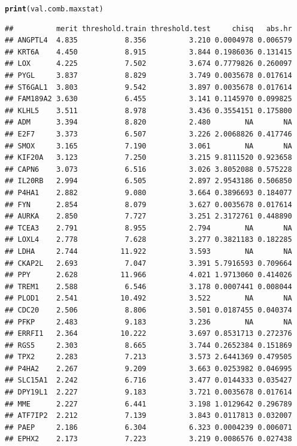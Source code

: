 \documentclass{article}\usepackage[]{graphicx}\usepackage[]{color}
\makeatletter
\newcommand{\hlstd}[1]{\textcolor[rgb]{0.345,0.345,0.345}{#1}}%
\newcommand{\hlkwd}[1]{\textcolor[rgb]{0.737,0.353,0.396}{\textbf{#1}}}%
\newenvironment{kframe}{%
 \def\at@end@of@kframe{}%
 \ifinner\ifhmode%
  \def\at@end@of@kframe{\end{minipage}}%
  \begin{minipage}{\columnwidth}%
 \fi\fi%
 \def\FrameCommand##1{\hskip\@totalleftmargin \hskip-\fboxsep
 \colorbox{shadecolor}{##1}\hskip-\fboxsep
     \hskip-\linewidth \hskip-\@totalleftmargin \hskip\columnwidth}%
 \MakeFramed {\advance\hsize-\width
   \@totalleftmargin\z@ \linewidth\hsize
   \@setminipage}}%
 {\par\unskip\endMakeFramed%
 \at@end@of@kframe}
\newenvironment{knitrout}{}{} %
\makeatother
\begin{document}
\begin{knitrout}
\begin{kframe}
\begin{alltt}
\hlkwd{print}\hlstd{(val.comb.maxstat)}
\end{alltt}
\begin{verbatim}
##          merit threshold.train threshold.test     chisq   abs.hr
## ANGPTL4  4.835           8.356          3.210 0.0004978 0.006579
## KRT6A    4.450           8.915          3.844 0.1986036 0.131415
## LOX      4.225           7.502          3.674 0.7779826 0.260097
## PYGL     3.837           8.829          3.749 0.0035678 0.017614
## ST6GAL1  3.803           9.542          3.897 0.0035678 0.017614
## FAM189A2 3.630           6.455          3.141 0.1145970 0.099825
## KLHL5    3.511           8.978          3.436 0.3554151 0.175800
## ADM      3.394           8.820          2.480        NA       NA
## E2F7     3.373           6.507          3.226 2.0068826 0.417746
## SMOX     3.165           7.190          3.061        NA       NA
## KIF20A   3.123           7.250          3.215 9.8111520 0.923658
## CAPN6    3.073           6.516          3.026 3.8052088 0.575228
## IL20RB   2.994           6.505          2.897 2.9543186 0.506850
## P4HA1    2.882           9.080          3.664 0.3896693 0.184077
## FYN      2.854           8.079          3.627 0.0035678 0.017614
## AURKA    2.850           7.727          3.251 2.3172761 0.448890
## TCEA3    2.791           8.955          2.794        NA       NA
## LOXL4    2.778           7.628          3.277 0.3821183 0.182285
## LDHA     2.744          11.922          3.593        NA       NA
## CKAP2L   2.693           7.047          3.391 5.7916593 0.709664
## PPY      2.628          11.966          4.021 1.9713060 0.414026
## TREM1    2.588           6.546          3.178 0.0007441 0.008044
## PLOD1    2.541          10.492          3.522        NA       NA
## CDC20    2.506           8.806          3.501 0.0187455 0.040374
## PFKP     2.483           9.183          3.236        NA       NA
## ERRFI1   2.364          10.222          3.697 0.8531713 0.272376
## RGS5     2.303           8.665          3.744 0.2652384 0.151869
## TPX2     2.283           7.213          3.573 2.6441369 0.479505
## P4HA2    2.267           9.209          3.663 0.0253982 0.046995
## SLC15A1  2.242           6.716          3.477 0.0144333 0.035427
## DPY19L1  2.227           9.183          3.721 0.0035678 0.017614
## MME      2.227           6.441          3.198 1.0129642 0.296789
## ATF7IP2  2.212           7.139          3.843 0.0117813 0.032007
## PAEP     2.186           6.304          6.323 0.0004239 0.006071
## EPHX2    2.173           7.223          3.219 0.0086576 0.027438

\end{verbatim}
\end{kframe}
\end{knitrout}
\end{document}
